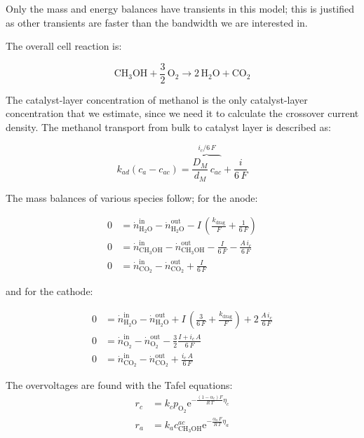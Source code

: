 \documentclass[a4paper]{article}
\newcommand{\e}{\ensuremath{\mathrm{e}}}
\newcommand{\COO}{\ensuremath{\mathrm{CO_2}}}
\newcommand{\OO}{\ensuremath{\mathrm{O_2}}}
\newcommand{\HHO}{\ensuremath{\mathrm{H_2O}}}
\newcommand{\MeOH}{\ensuremath{\mathrm{CH_3OH}}}
\begin{document}
Only the mass and energy balances have transients in this model; this is
justified as other transients are faster than the bandwidth we are interested
in.

The overall cell reaction is:

\begin{equation}
\MeOH + \frac{3}{2}\,\OO \rightarrow 2\,\HHO + \COO
\end{equation}

The catalyst-layer concentration of methanol is the only catalyst-layer
concentration that we estimate, since we need it to calculate the crossover
current density. The methanol transport from bulk to catalyst layer is described
as:

\begin{equation}
k_{ad}(c_a-c_{ac}) = \overbrace{\frac{D_M}{d_M}\,c_{ac}}^{i_c/6\,F}
+ \frac{i}{6\,F}
\end{equation}

The mass balances of various species follow; for the anode:

\begin{align}
0 &= \dot n_\HHO^\text{in} - \dot n_\HHO^\text{out}
- I\,\left(\frac{k_\text{drag}}{F} + \frac{1}{6\,F}\right)\\
0 &= \dot n_\MeOH^\text{in} - \dot n_\MeOH^\text{out} - \frac{I}{6\,F} -
\frac{A\,i_c}{6\,F}\\
0 &= \dot n_\COO^\text{in} - \dot n_\COO^\text{out} + \frac{I}{6\,F}
\end{align}

and for the cathode:

\begin{align}
0 &= \dot n_\HHO^\text{in} - \dot n_\HHO^\text{out} + I\,\left(\frac{3}{6\,F} +
\frac{k_\text{drag}}{F}\right) + 2\,\frac{A\,i_c}{6\,F}\\
0 &= \dot n_\OO^\text{in} - \dot n_\OO^\text{out}
- \frac{3}{2}\frac{I+i_c\,A}{6\,F}\\
0 &= \dot n_\COO^\text{in} - \dot n_\COO^\text{out} + \frac{i_c\,A}{6\,F}
\end{align}

The overvoltages are found with the Tafel equations:
\begin{align}
r_c & = k_c p_\OO \e^{-\frac{(1-\alpha_c)F}{R\,T}\eta_c}\\
r_a & = k_a c_\MeOH^{ac} \e^{-\frac{\alpha_a\,F}{R\,T}\eta_a}
\end{align}
\end{document}
